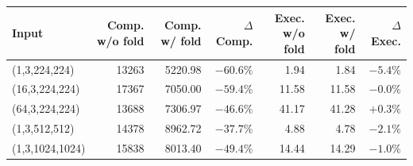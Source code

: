 \begin{tabular}{lrrrrrr}
\toprule
\textbf{Input} & \textbf{Comp. w/o fold} & \textbf{Comp. w/ fold} & \(\Delta\)\textbf{ Comp.} & \textbf{Exec. w/o fold} & \textbf{Exec. w/ fold} & \(\Delta\)\textbf{ Exec.} \\
\midrule
(1,3,224,224) & 13263 & 5220.98 & \(-60.6\%\) & 1.94 & 1.84 & \(-5.4\%\) \\
(16,3,224,224) & 17367 & 7050.00 & \(-59.4\%\) & 11.58 & 11.58 & \(-0.0\%\) \\
(64,3,224,224) & 13688 & 7306.97 & \(-46.6\%\) & 41.17 & 41.28 & \(+0.3\%\) \\
(1,3,512,512) & 14378 & 8962.72 & \(-37.7\%\) & 4.88 & 4.78 & \(-2.1\%\) \\
(1,3,1024,1024) & 15838 & 8013.40 & \(-49.4\%\) & 14.44 & 14.29 & \(-1.0\%\) \\
\bottomrule
\end{tabular}
